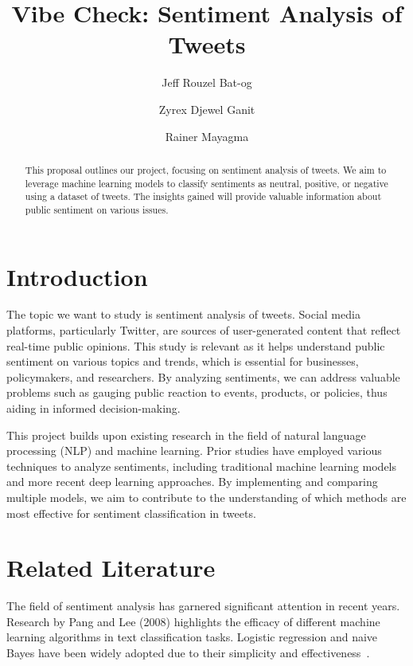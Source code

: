 \documentclass[runningheads]{llncs}
\begin{document}
\title{Vibe Check: Sentiment Analysis of Tweets}
\author{Jeff Rouzel Bat-og \and Zyrex Djewel Ganit \and Rainer Mayagma}

\maketitle

\begin{abstract}
This proposal outlines our project, focusing on sentiment analysis of tweets. We aim to leverage 
machine learning models to classify sentiments as neutral, positive, or negative using a dataset 
of tweets. The insights gained will provide valuable information about public sentiment on various issues.
\end{abstract}


\section{Introduction}
The topic we want to study is sentiment analysis of tweets. Social media platforms, particularly 
Twitter, are sources of user-generated content that reflect real-time public opinions. This study 
is relevant as it helps understand public sentiment on various topics and trends, which is 
essential for businesses, policymakers, and researchers. By analyzing sentiments, we can address 
valuable problems such as gauging public reaction to events, products, or policies, thus aiding in informed decision-making.

This project builds upon existing research in the field of natural language processing (NLP) and 
machine learning. Prior studies have employed various techniques to analyze sentiments, including 
traditional machine learning models and more recent deep learning approaches. By implementing and 
comparing multiple models, we aim to contribute to the understanding of which methods are most 
effective for sentiment classification in tweets.

\section{Related Literature}
The field of sentiment analysis has garnered significant attention in recent years. Research by 
Pang and Lee (2008) highlights the efficacy of different machine learning algorithms in text 
classification tasks. Logistic regression and naive Bayes have been widely adopted due to their 
simplicity and effectiveness~\cite{ref_article1}.
\end{document}
